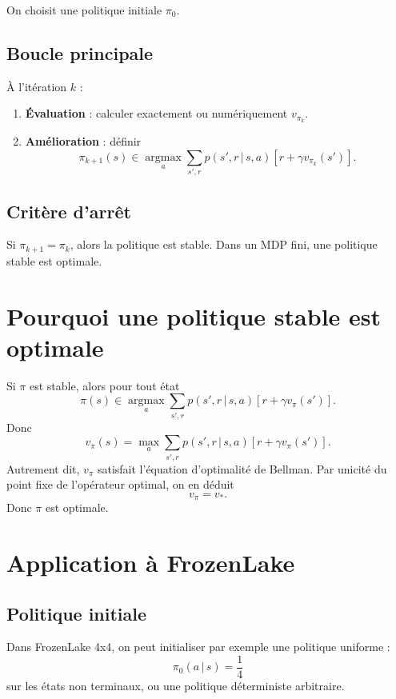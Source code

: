 \documentclass[11pt,a4paper]{article}
\newcommand{\argmax}{\operatorname*{argmax}}
\newcommand{\given}{\,|\,}
\begin{document}
On choisit une politique initiale $\pi_0$.

\subsection{Boucle principale}

À l'itération $k$ :

\begin{enumerate}[leftmargin=1.6em]
    \item \textbf{Évaluation} : calculer exactement ou numériquement $v_{\pi_k}$.
    \item \textbf{Amélioration} : définir
    \[
    \pi_{k+1}(s)\in \argmax_a \sum_{s',r} p(s',r\given s,a)\left[r+\gamma v_{\pi_k}(s')\right].
    \]
\end{enumerate}

\subsection{Critère d'arrêt}

Si $\pi_{k+1}=\pi_k$, alors la politique est stable. Dans un MDP fini, une politique stable est optimale.

\section{Pourquoi une politique stable est optimale}

Si $\pi$ est stable, alors pour tout état
\[
\pi(s)\in \argmax_a \sum_{s',r}p(s',r\given s,a)\left[r+\gamma v_{\pi}(s')\right].
\]
Donc
\[
v_{\pi}(s)=\max_a \sum_{s',r}p(s',r\given s,a)\left[r+\gamma v_{\pi}(s')\right].
\]
Autrement dit, $v_{\pi}$ satisfait l'équation d'optimalité de Bellman. Par unicité du point fixe de l'opérateur optimal, on en déduit
\[
v_{\pi}=v_*.
\]
Donc $\pi$ est optimale.

\section{Application à FrozenLake}

\subsection{Politique initiale}

Dans FrozenLake 4x4, on peut initialiser par exemple une politique uniforme :
\[
\pi_0(a\given s)=\frac14
\]
sur les états non terminaux, ou une politique déterministe arbitraire.
\end{document}
